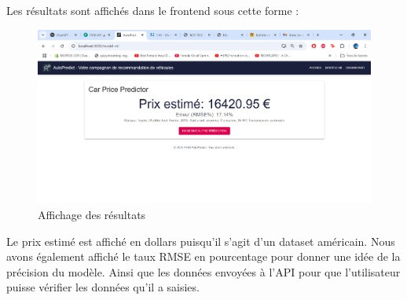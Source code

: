 \documentclass[12pt]{report}
\begin{document}
Les résultats sont affichés dans le frontend sous cette forme : 

\begin{figure}[H]
    \centering
    \includegraphics[width=1\textwidth]{resultats.png}
    \caption{Affichage des résultats}
    \label{fig:resultats}
\end{figure}
Le prix estimé est affiché en dollars puisqu'il s'agit d'un dataset américain. Nous avons également affiché le taux RMSE en pourcentage pour donner une idée de la précision du modèle. Ainsi que les données envoyées à l'API pour que l'utilisateur puisse vérifier les données qu'il a saisies.
\end{document}
